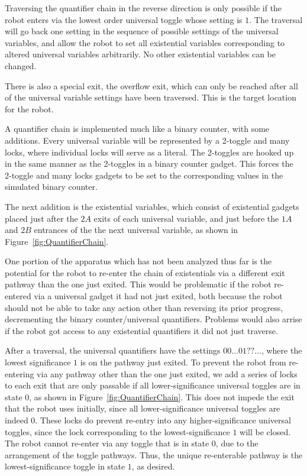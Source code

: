 Traversing  the quantifier chain in the reverse direction is only possible if the robot enters
via the lowest order universal toggle whose setting is $1$. The traversal will go back one setting in the
sequence of possible settings of the universal variables, and allow the robot to set all existential variables
corresponding to altered universal variables arbitrarily. No other existential variables can be changed.

There is also a special exit, the overflow exit, which can only be
reached after all of the universal variable settings have been traversed. This is the target location for the robot.

A quantifier chain is implemented much like a binary counter, with some additions. Every universal variable will be represented by a 2-toggle and many locks, where individual locks will serve as a literal. The 2-toggles are hooked up in the same manner as the 2-toggles in a binary counter gadget. This forces the 2-toggle and many locks gadgets to be set to the corresponding values in the simulated binary counter.

The next addition is the existential variables, which consist of existential gadgets placed just after the $2A$
exits of each universal variable,
and just before the $1A$ and $2B$ entrances of the the next universal variable, as shown
in Figure~\ref{fig:QuantifierChain}.

One portion of the apparatus which has not been analyzed thus far is the potential for the robot to re-enter the chain of existentials
via a different exit pathway than the one just exited. This would be problematic if the robot re-entered via a universal gadget it had not just exited,
both because the robot should not be able to take any action other than reversing its prior progress, 
decrementing the binary counter/universal quantifiers. Problems would also arrise if the robot got access to any existential quantifiers 
it did not just traverse.

After a traversal, the universal quantifiers have the settings $0 0 \ldots 0 1 ? ? \ldots$, where the lowest significance $1$ is 
on the pathway just exited.
To prevent the robot from re-entering via any pathway other than the one just exited, we add a series of locks to each exit that are only passable
if all lower-significance universal toggles are in state $0$, as shown in Figure~\ref{fig:QuantifierChain}.
This does not impede the exit that the robot uses initially, since all
lower-significance universal toggles are indeed $0$. These locks do prevent re-entry into any higher-significance universal toggles, since the
lock corresponding to the lowest-significance $1$ will be closed. The robot cannot re-enter via any toggle that is in state $0$,
due to the arrangement of the toggle pathways. Thus, the unique re-enterable pathway is the lowest-significance toggle in state $1$, as desired.

